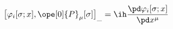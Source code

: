 \begin{equation}	\label{12.52}
\bigl[ \varphi_i[\sigma;x] , \ope[0]{P}_\mu [\sigma] \bigr]_{\_}
=
\ih\frac{\pd \varphi_i[\sigma;x]  }{\pd x^\mu}
	\end{equation}

